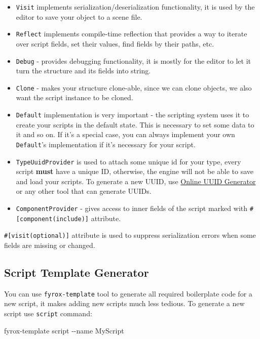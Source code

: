 \documentclass[
]{book}
\newenvironment{Shaded}{\begin{snugshade}}{\end{snugshade}}
\newcommand{\NormalTok}[1]{#1}
\providecommand{\tightlist}{%
  \setlength{\itemsep}{0pt}\setlength{\parskip}{0pt}}
\theoremstyle{definition}
\theoremstyle{definition}
\theoremstyle{definition}
\theoremstyle{definition}
\theoremstyle{remark}
\begin{document}
\begin{itemize}
\tightlist
\item
  \texttt{Visit} implements serialization/deserialization functionality, it is used by the editor to save your object to a scene file.
\item
  \texttt{Reflect} implements compile-time reflection that provides a way to iterate over script fields, set their values, find fields by their paths, etc.
\item
  \texttt{Debug} - provides debugging functionality, it is mostly for the editor to let it turn the structure and its fields into string.
\item
  \texttt{Clone} - makes your structure clone-able, since we can clone objects, we also want the script instance to be cloned.
\item
  \texttt{Default} implementation is very important - the scripting system uses it to create your scripts in the default state. This is necessary to set some data to it and so on. If it's a special case, you can always implement your own \texttt{Default}'s implementation if it's necessary for your script.
\item
  \texttt{TypeUuidProvider} is used to attach some unique id for your type, every script \textbf{must} have a unique ID, otherwise, the engine will not be able to save and load your scripts. To generate a new UUID, use \href{https://www.uuidgenerator.net/}{Online UUID Generator} or any other tool that can generate UUIDs.
\item
  \texttt{ComponentProvider} - gives access to inner fields of the script marked with \texttt{\#{[}component(include){]}} attribute.
\end{itemize}

\texttt{\#{[}visit(optional){]}} attribute is used to suppress serialization errors when some fields are missing or changed.

\subsection{Script Template Generator}\label{script-template-generator}

You can use \texttt{fyrox-template} tool to generate all required boilerplate code for a new script, it makes adding new scripts much less tedious. To generate a new script use \texttt{script} command:

\begin{Shaded}
\begin{Highlighting}[]
\NormalTok{fyrox{-}template script {-}{-}name MyScript}
\end{Highlighting}
\end{Shaded}
\end{document}
